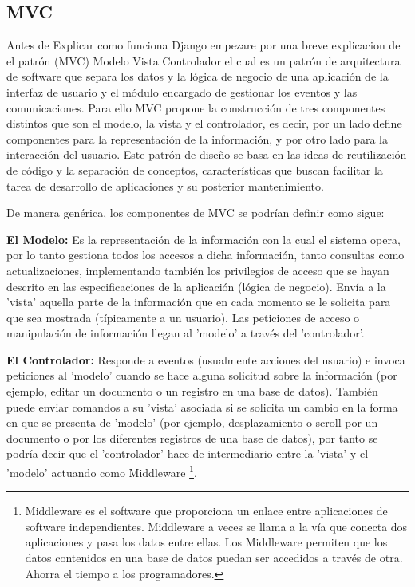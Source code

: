 \subsection{MVC}

Antes de Explicar como funciona Django empezare por una breve explicacion de
el patr\'on (MVC) Modelo Vista Controlador el cual es un patrón de arquitectura de software que
separa los datos y la lógica de negocio de una aplicación de la interfaz de
usuario y el módulo encargado de gestionar los eventos y las comunicaciones.
Para ello MVC propone la construcción de tres componentes distintos que son el
modelo, la vista y el controlador, es decir, por un lado define componentes
para la representación de la información, y por otro lado para la interacción
 del usuario. Este patrón de diseño se basa en las ideas de reutilización de
 código y la separación de conceptos, características que buscan facilitar la
 tarea de desarrollo de aplicaciones y su posterior mantenimiento.

De manera genérica, los componentes de MVC se podrían definir como sigue:

{\bfseries  El Modelo:} Es la representación de la información con la cual el sistema opera,
por lo tanto gestiona todos los accesos a dicha información, tanto consultas
como actualizaciones, implementando también los privilegios de acceso que se
hayan descrito en las especificaciones de la aplicación (lógica de negocio).
Envía a la 'vista' aquella parte de la información que en cada momento se le
solicita para que sea mostrada (típicamente a un usuario). Las peticiones de
acceso o manipulación de información llegan al 'modelo' a través del
'controlador'.

{\bfseries El Controlador: } Responde a eventos (usualmente acciones del
usuario) e invoca peticiones al 'modelo' cuando se hace alguna solicitud sobre
la información (por ejemplo, editar un documento o un registro en una base de
datos). También puede enviar comandos a su 'vista' asociada si se solicita un
cambio en la forma en que se presenta de 'modelo' (por ejemplo, desplazamiento
 o scroll por un documento o por los diferentes registros de una base de datos),
  por tanto se podría decir que el 'controlador' hace de intermediario entre
   la 'vista' y el 'modelo' actuando como Middleware
\footnote{Middleware es el software que proporciona un enlace entre aplicaciones de software
independientes. Middleware a veces se llama a la vía que conecta dos
aplicaciones y pasa los datos entre ellas. Los Middleware permiten que los
datos contenidos en una base de datos puedan ser accedidos a través de otra.
Ahorra el tiempo a los programadores.}.
   
